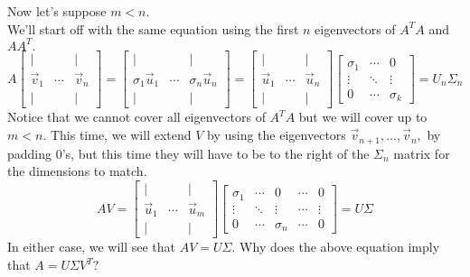 \begin{enumerate}
{    Now let's suppose $m < n.$ \\
    We'll start off with the same equation using the first $n$ eigenvectors of $A^{T}A$ and $AA^{T}.$
    $$A \begin{bmatrix} | & \ & | \\
    \vec{v}_{1} & \cdots & \vec{v}_{n}  \\ | & \ & | \end{bmatrix} 
    =  \begin{bmatrix} | & \ & | \\ \sigma_{1} \vec{u}_{1} & \cdots & \sigma_{n} \vec{u}_{n} \\ | & \ & | \end{bmatrix} = 
     \begin{bmatrix} | & \ & | \\ \vec{u}_{1} & \cdots & \vec{u}_{n} \\ | & \ & | \end{bmatrix}  
     \begin{bmatrix} \sigma_{1} & \cdots & 0 \\ \vdots & \ddots & \vdots \\ 0 & \cdots & \sigma_{k} \end{bmatrix} = U_{n} \Sigma_{n}$$
    Notice that we cannot cover all eigenvectors of $A^{T} A$ but we will cover up to $m < n.$
    This time, we will extend $V$ by using the eigenvectors $\vec{v}_{n + 1}, \dotsc, \vec{v}_{n},$ by padding $0$'s, but this time they will have to be to the right of the $\Sigma_{n}$ matrix for the dimensions to match.
    $$AV =  \begin{bmatrix} | & \ & | \\ \vec{u}_{1} & \cdots & \vec{u}_{m} \\ | & \ & | \end{bmatrix} 
    \begin{bmatrix} \sigma_{1} & \cdots & 0 & \cdots & 0 \\
    \vdots & \ddots & \vdots & \cdots & \vdots \\
    0 & \cdots & \sigma_{n} & \cdots & 0 \end{bmatrix}
     = U \Sigma$$
    In either case, we will see that $AV = U\Sigma.$ 
  }
  \qitem Why does the above equation imply that $A = U \Sigma V^{T}?$



\end{enumerate}
